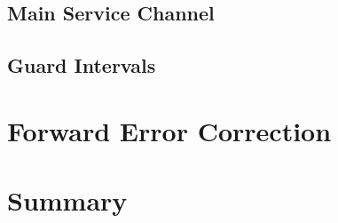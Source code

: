 \documentclass[class=report,11pt,crop=false]{standalone}
\begin{document}
\subsection{Main Service Channel}
\blindtext

\subsection{Guard Intervals}
\blindtext

\section{Forward Error Correction}
\blindtext

\section{Summary}
\blindtext

\ifstandalone

\printnoidxglossary[type=\acronymtype,nonumberlist]
\fi
\end{document}
